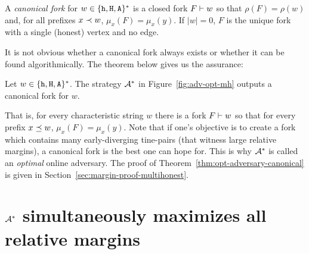 \begin{definition}
  A \emph{canonical fork} for $w \in \{\mathtt{h}, \mathtt{H}, \mathtt{A}\}^*$ 
  is a closed fork $F \vdash w$ so that 
  $\rho(F) = \rho(w)$ 
  and, for all prefixes $x \prec w$, $\mu_x(F) = \mu_x(y)$. 
  If $|w| = 0$, $F$ is 
  the unique fork with a single (honest) vertex and no edge. 
\end{definition}

It is not obvious whether a canonical fork always exists 
or whether it can be found algorithmically. 
The theorem below gives us the assurance:


\begin{theorem}\label{thm:opt-adversary-canonical}
  Let $w \in \{\mathtt{h}, \mathtt{H}, \mathtt{A}\}^*$. 
  The strategy $\mathcal{A}^*$ in Figure~\ref{fig:adv-opt-mh}
  outputs a canonical fork for $w$.  
\end{theorem}
That is, for every characteristic string $w$ 
there is a fork $F \vdash w$ so that 
for every prefix $x \preceq w$, $\mu_x(F) = \mu_x(y)$. 
Note that if one's objective is to create a fork 
which contains many early-diverging tine-pairs (that witness large relative margins), 
a canonical fork is the best one can hope for. 
This is why $\mathcal{A}^*$ is called an \emph{optimal} online adversary. 
The proof of Theorem~\ref{thm:opt-adversary-canonical} 
is given in Section~\ref{sec:margin-proof-multihonest}.



\section{\texorpdfstring{$\mathcal{A}^*$}{The optimal adversary} simultaneously maximizes all relative margins}\label{sec:opt-adv-lowerbound}

